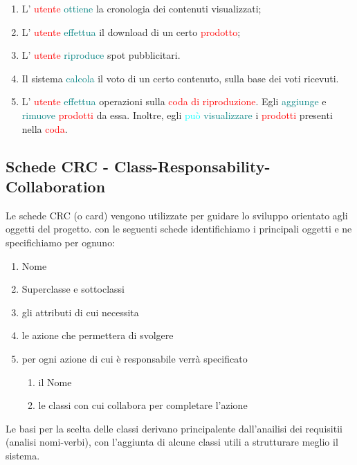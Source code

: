 \begin{enumerate}
    \item L' \textcolor{red}{utente} \textcolor{teal}{ottiene} la cronologia dei contenuti visualizzati;
    \item L' \textcolor{red}{utente} \textcolor{teal}{effettua} il download di un certo \textcolor{red}{prodotto};
    \item L' \textcolor{red}{utente} \textcolor{teal}{riproduce} spot pubblicitari.
    \item Il sistema \textcolor{teal}{calcola} il voto di un certo contenuto, sulla base dei voti ricevuti.
    \item L' \textcolor{red}{utente} \textcolor{teal}{effettua} operazioni sulla \textcolor{red}{coda di riproduzione}. Egli \textcolor{teal}{aggiunge}
    e \textcolor{teal}{rimuove} \textcolor{red}{prodotti} da essa. Inoltre, egli \textcolor{cyan}{può} \textcolor{teal}{visualizzare} i 
    \textcolor{red}{prodotti} presenti nella \textcolor{red}{coda}.
\end{enumerate}



\subsection{Schede CRC - Class-Responsability-Collaboration}

Le schede CRC (o card) vengono utilizzate per guidare lo sviluppo orientato agli oggetti del progetto.
con le seguenti schede identifichiamo i principali oggetti e ne specifichiamo per ognuno:
\begin{enumerate}[label=-]
    \item Nome
   \item Superclasse e sottoclassi
    \item gli attributi di cui necessita
    \item le azione che permettera di svolgere
    \item per ogni azione di cui è responsabile verrà specificato
    \begin{enumerate}[label=-]
        \item il Nome
        \item le classi con cui collabora per completare l'azione
   \end{enumerate}
\end{enumerate}

Le basi per la scelta delle classi derivano principalente dall'anailisi dei requisitii (analisi nomi-verbi), con l'aggiunta di alcune classi utili a strutturare meglio il sistema.\\

